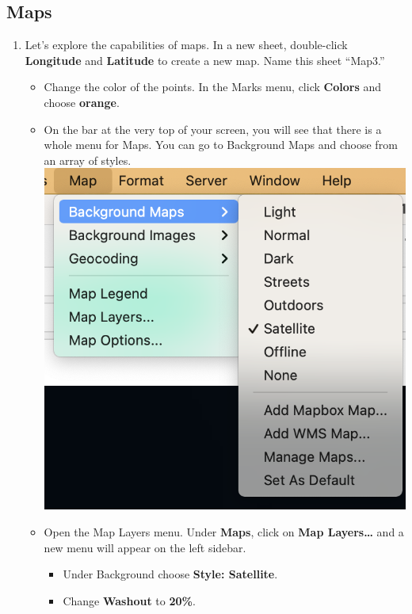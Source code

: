 \documentclass[
]{book}
\providecommand{\tightlist}{%
  \setlength{\itemsep}{0pt}\setlength{\parskip}{0pt}}
\begin{document}
\hypertarget{maps}{%
\subsection{Maps}\label{maps}}

\begin{enumerate}
\def\labelenumi{\arabic{enumi}.}
\tightlist
\item
  Let's explore the capabilities of maps. In a new sheet, double-click \textbf{Longitude} and \textbf{Latitude} to create a new map. Name this sheet ``Map3.''

  \begin{itemize}
  \tightlist
  \item
    Change the color of the points. In the Marks menu, click \textbf{Colors} and choose \textbf{orange}.
  \item
    On the bar at the very top of your screen, you will see that there is a whole menu for Maps. You can go to Background Maps and choose from an array of styles.
    \includegraphics{images/M3S3-map3-menu.png}
  \item
    Open the Map Layers menu. Under \textbf{Maps}, click on \textbf{Map Layers\ldots{}} and a new menu will appear on the left sidebar.

    \begin{itemize}
    \tightlist
    \item
      Under Background choose \textbf{Style: Satellite}.
    \item
      Change \textbf{Washout} to \textbf{20\%}.


\end{itemize}
\end{itemize}
\end{enumerate}
\end{document}
